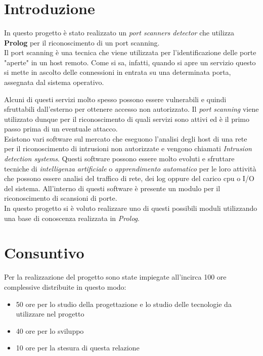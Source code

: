 \documentclass[a4paper,12pt]{article} %
\title{\bf \the\titolo}
\author{}
\date{\the\data}
\begin{document}


\newpage

\tableofcontents

\newpage

\section{Introduzione}

In questo progetto è stato realizzato un \emph{port scanners detector} che utilizza \textbf{Prolog} per il riconoscimento
di un port scanning.\\

Il port scanning è una tecnica che viene utilizzata per l'identificazione delle porte "aperte" in un host remoto.
Come si sa, infatti, quando si apre un servizio questo si mette in ascolto delle connessioni in entrata su una determinata porta, assegnata dal sistema 
operativo.

Alcuni di questi servizi molto spesso possono essere vulnerabili e quindi sfruttabili dall'esterno per ottenere accesso
non autorizzato. Il \emph{port scanning} viene utilizzato dunque per il riconoscimento di quali servizi sono attivi ed
è il primo passo prima di un eventuale attacco.\\


Esistono vari software sul mercato che eseguono l'analisi degli host di una rete per il riconoscimento di intrusioni 
non autorizzate e vengono chiamati \emph{Intrusion detection systems}. Questi software possono essere molto evoluti 
e sfruttare tecniche di \emph{intelligenza artificiale} o \emph{apprendimento automatico} per le loro attività che possono essere analisi del traffico di rete, dei log oppure del carico cpu o I/O del sistema. All'interno di questi software è 
presente un modulo per il riconoscimento di scansioni di porte. \\

In questo progetto si è voluto realizzare uno di questi possibili moduli utilizzando una base di conoscenza
realizzata in \emph{Prolog}.  



\section{Consuntivo}

Per la realizzazione del progetto sono state impiegate all'incirca 100 ore complessive distribuite in questo modo:

\begin{itemize}

\item 50 ore per lo studio della progettazione e lo studio delle tecnologie da utilizzare nel progetto
\item 40 ore per lo sviluppo 
\item 10 ore per la stesura di questa relazione


\end{itemize}
\end{document}
